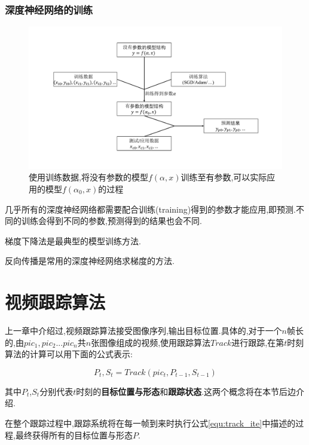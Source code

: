 \subsubsection{深度神经网络的训练}
\par
\begin{figure}[htbp!]
    \centering
    \includegraphics[width = 1.\textwidth]{chap/img/model_learning.pdf}
    \caption{使用训练数据,将没有参数的模型$f(\alpha,x)$训练至有参数,可以实际应用的模型$f(\alpha_0,x)$的过程}
    \label{fig:model_learning}
\end{figure}
几乎所有的深度神经网络都需要配合训练(training)得到的参数才能应用,即预测.不同的训练会得到不同的参数,预测得到的结果也会不同.
\par
梯度下降法是最典型的模型训练方法.
\par
反向传播是常用的深度神经网络求梯度的方法.

\section{视频跟踪算法}
上一章中介绍过,视频跟踪算法接受图像序列,输出目标位置.具体的,对于一个$n$帧长的,由$pic_1,pic_2...pic_n$共$n$张图像组成的视频,使用跟踪算法$Track$进行跟踪,在第$t$时刻算法的计算可以用下面的公式表示:
\par
\begin{equation}\label{equ:track_ite}  P_t,S_t=Track(pic_{t},P_{t-1},S_{t-1})  \end{equation}
\par
其中$P_t$,$S_t$分别代表$t$时刻的\textbf{目标位置与形态}和\textbf{跟踪状态}.这两个概念将在本节后边介绍.
\par
在整个跟踪过程中,跟踪系统将在每一帧到来时执行公式\ref{equ:track_ite}中描述的过程,最终获得所有的目标位置与形态$P$.
\par
